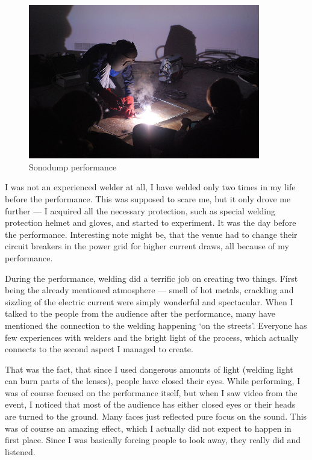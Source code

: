 \documentclass[12pt,a4paper,oneside]{report}
\begin{document}
\begin{figure}  
  \centering
    \includegraphics[width=0.9\textwidth]{img/zvarac}
	\caption{Sonodump performance}
	\label{fig:zvarac}
\end{figure}

I was not an experienced welder at all, I have welded only two times in my life before the performance. This was supposed to scare me, but it only drove me further --- I acquired all the necessary protection, such as special welding protection helmet and gloves, and started to experiment. It was the day before the performance. Interesting note might be, that the venue had to change their circuit breakers in the power grid for higher current draws, all because of my performance.

During the performance, welding did a terrific job on creating two things. First being the already mentioned atmosphere --- smell of hot metals, crackling and sizzling of the electric current were simply wonderful and spectacular. When I talked to the people from the audience after the performance, many have mentioned the connection to the welding happening `on the streets'. Everyone has few experiences with welders and the bright light of the process, which actually connects to the second aspect I managed to create. 

That was the fact, that since I used dangerous amounts of light (welding light can burn parts of the lenses), people have closed their eyes. While performing, I was of course focused on the performance itself, but when I saw video from the event, I noticed that most of the audience has either closed eyes or their heads are turned to the ground. Many faces just reflected pure focus on the sound. This was of course an amazing effect, which I actually did not expect to happen in first place. Since I was basically forcing people to look away, they really did and listened.
\end{document}
